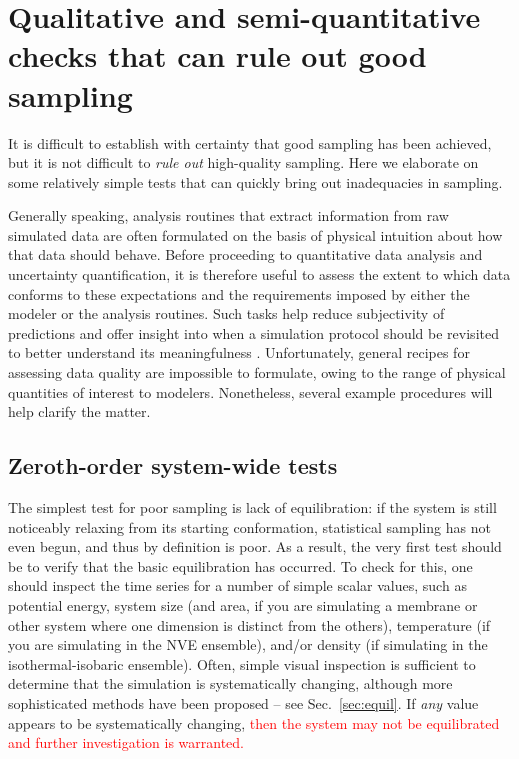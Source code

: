 
\section{Qualitative and semi-quantitative checks that can rule out good sampling}
\label{sec:quick}

It is difficult to establish with certainty that good sampling has been achieved, but it is not difficult to \emph{rule out} high-quality sampling.
Here we elaborate on some relatively simple tests that can quickly bring out inadequacies in sampling.

Generally speaking, analysis routines that extract information from raw simulated data are often formulated on the basis of physical intuition about how that data should behave.  Before proceeding to quantitative data analysis and uncertainty quantification, it is therefore useful to assess the extent to which data conforms to these expectations and the requirements imposed by either the modeler or the analysis routines.  Such tasks help reduce subjectivity of predictions and offer insight into when a simulation protocol should be revisited to better understand its meaningfulness \cite{patrone1}.  Unfortunately, general recipes for assessing data quality are impossible to formulate, owing to the range of physical quantities of interest to modelers.  Nonetheless, several example procedures will help clarify the matter.

\subsection{Zeroth-order system-wide tests}
\label{sec:zeroth}

The simplest test for poor sampling is lack of equilibration: if the system is still noticeably relaxing from its starting conformation, statistical sampling has not even begun, and thus by definition is poor.  As a result, the very first test should be to verify that the basic equilibration has occurred.  To check for this, one should inspect the time series for a number of simple scalar values, such as potential energy, system size (and area, if you are simulating a membrane or other system where one dimension is distinct from the others), temperature (if you are simulating in the NVE ensemble), and/or density (if simulating in the isothermal-isobaric ensemble).  Often, simple visual inspection is sufficient to determine that the simulation is systematically changing, although more sophisticated methods have been proposed -- see Sec.\ \ref{sec:equil}.  If \emph{any} value appears to be systematically changing, %
\textcolor{red}{then the system may not be equilibrated and further investigation is warranted.}  

